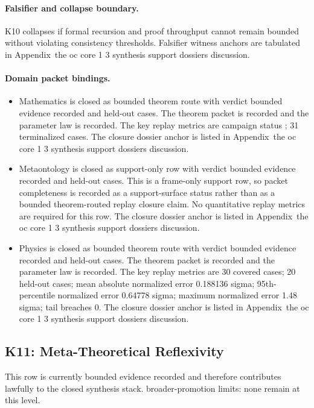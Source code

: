 \paragraph{Falsifier and collapse boundary.}
K10 collapses if formal recursion and proof throughput cannot remain bounded without violating consistency thresholds.
Falsifier witness anchors are tabulated in Appendix~the oc core 1 3 synthesis support dossiers discussion.

\paragraph{Domain packet bindings.}
\begin{itemize}[leftmargin=1.6em,nosep]
\item Mathematics is closed as bounded theorem route with verdict bounded evidence recorded and  held-out cases. The theorem packet is recorded and the parameter law is recorded. The key replay metrics are campaign status ; 31 terminalized cases. The closure dossier anchor is listed in Appendix~the oc core 1 3 synthesis support dossiers discussion.
\item Metaontology is closed as support-only row with verdict bounded evidence recorded and  held-out cases. This is a frame-only support row, so packet completeness is recorded as a support-surface status rather than as a bounded theorem-routed replay closure claim. No quantitative replay metrics are required for this row. The closure dossier anchor is listed in Appendix~the oc core 1 3 synthesis support dossiers discussion.
\item Physics is closed as bounded theorem route with verdict bounded evidence recorded and  held-out cases. The theorem packet is recorded and the parameter law is recorded. The key replay metrics are 30 covered cases; 20 held-out cases; mean absolute normalized error 0.188136 sigma; 95th-percentile normalized error 0.64778 sigma; maximum normalized error 1.48 sigma; tail breaches 0. The closure dossier anchor is listed in Appendix~the oc core 1 3 synthesis support dossiers discussion.
\end{itemize}

\subsection{K11: Meta-Theoretical Reflexivity}
\label{sec:oc-core-1-3-synthesis-k11}
This row is currently bounded evidence recorded and therefore contributes lawfully to the closed synthesis stack.
broader-promotion limits: none remain at this level.

